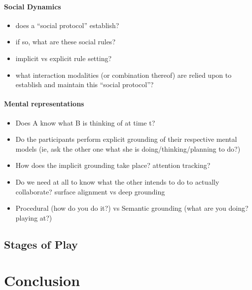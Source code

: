\documentclass[sigconf]{acmart}
\begin{document}
\paragraph{Social Dynamics}

\begin{itemize}
    \item does a ``social protocol'' establish?
    \item if so, what are these social rules?
    \item implicit vs explicit rule setting?
    \item what interaction modalities (or combination thereof) are relied upon
        to establish and maintain this ``social protocol''?
\end{itemize}

\paragraph{Mental representations}

\begin{itemize}
    \item Does A know what B is thinking of at time t?
    \item Do the participants perform explicit grounding of their respective mental models
        (ie, ask the other one what she is doing/thinking/planning to do?)
    \item How does the implicit grounding take place? attention tracking?
    \item Do we need at all to know what the other intends to do to actually
        collaborate? surface alignment vs deep grounding
    \item Procedural (how do you do it?) vs Semantic
        grounding (what are you doing? playing at?)
\end{itemize}

\subsection{Stages of Play}


\section{Conclusion}
\label{sec:conclusion}
\end{document}
